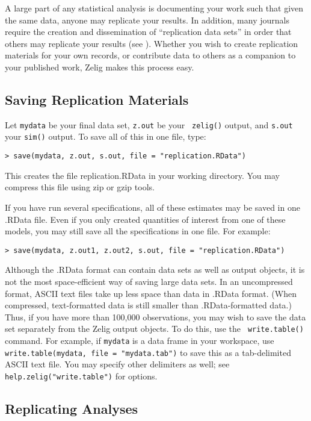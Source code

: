 A large part of any statistical analysis is documenting your work such
that given the same data, anyone may replicate your results.  In
addition, many journals require the creation and dissemination of
``replication data sets'' in order that others may replicate your
results (see \nocite{King95}).
Whether you wish to create replication materials for your own records,
or contribute data to others as a companion to your published work,
Zelig makes this process easy.

\subsection{Saving Replication Materials}

Let {\tt mydata} be your final data set, {\tt z.out} be your {\tt
  zelig()} output, and {\tt s.out} your {\tt sim()} output.  To save
all of this in one file, type:
\begin{verbatim}
> save(mydata, z.out, s.out, file = "replication.RData")
\end{verbatim}
This creates the file replication.RData in your working directory.
You may compress this file using zip or gzip tools.

If you have run several specifications, all of these estimates may be
saved in one .RData file.  Even if you only created quantities of
interest from one of these models, you may still save all the
specifications in one file.  For example:
\begin{verbatim}
> save(mydata, z.out1, z.out2, s.out, file = "replication.RData")
\end{verbatim}

Although the .RData format can contain data sets as well as output
objects, it is not the most space-efficient way of saving large data
sets.  In an uncompressed format, ASCII text files take up less space
than data in .RData format.  (When compressed, text-formatted data is
still smaller than .RData-formatted data.)  Thus, if you have more
than 100,000 observations, you may wish to save the data set
separately from the Zelig output objects.  To do this, use the {\tt
  write.table()} command.  For example, if {\tt mydata} is a data
frame in your workspace, use {\tt write.table(mydata, file =
  "mydata.tab")} to save this as a tab-delimited ASCII text file.  You
may specify other delimiters as well; see {\tt
  help.zelig("write.table")} for options.

\subsection{Replicating Analyses}

